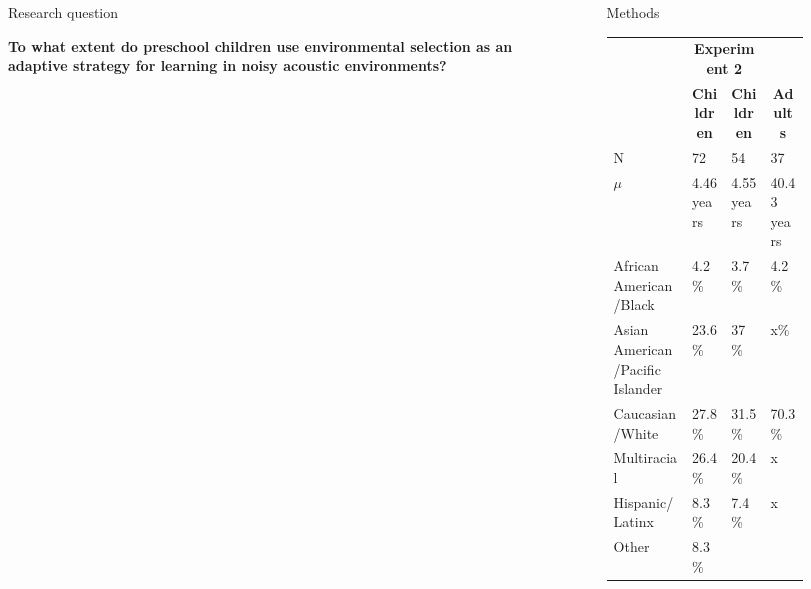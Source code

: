 \documentclass[final]{beamer}
\newlength{\sepwidth}
\newlength{\colwidth}
\newcommand{\separatorcolumn}{\begin{column}{\sepwidth}\end{column}}
\begin{document}
\begin{frame}[t]
\begin{columns}[t]
\begin{column}{\colwidth}
\begin{block}{Research question}
    \end{block}

  \begin{alertblock}

    \textbf{To what extent do preschool children use environmental selection as an adaptive strategy for learning in noisy acoustic environments?}

  \end{alertblock}

\end{column}

\separatorcolumn

\begin{column}{\colwidth}

  \begin{block}{Methods}

    \begin{itemize}
      \begin{table}[ht]
        \centering
        \begin{tabular}{|p{0.3\linewidth}|p{0.15\linewidth}|p{0.15\linewidth}| p{0.15\linewidth}|}
          \hline
          \right
          \rowcolor{cardinalred!80}
          \multicolumn{2}{|c|}{\textbf{Experiment 1}} & \multicolumn{2}{c|}{\textbf{Experiment 2}} \\
          \cline{2-4}
          \rowcolor{cardinalred!80}
          \multicolumn{1}{|c|}{\textbf{}} &
          \multicolumn{1}{|c|}{\textbf{Children}} & 
          \multicolumn{1}{|c|}{\textbf{Children}} & 
          \multicolumn{1}{|c|}{\textbf{Adults}} \\
          \hline
          N & 72 & 54 & 37 \\
          \hline
          \rowcolor{cardinalred!40}
          $\mu$ & 4.46 years & 4.55 years & 40.43 years \\
          \hline
          \raggedright African American/Black & 4.2\% & 3.7\% & 4.2\% \\ 
          \hline
          \rowcolor{cardinalred!40}
          \raggedright Asian American/Pacific Islander & 23.6\% & 37\% & x\% \\
          \hline
          Caucasian/White & 27.8\% & 31.5\% & 70.3\% \\
          \hline
          \rowcolor{cardinalred!40}
          Multiracial & 26.4\% & 20.4\% & x \\
          \hline
          Hispanic/Latinx & 8.3\% & 7.4\% & x \\
          \hline
          \rowcolor{cardinalred!40}
          Other & 8.3\% & & \\
          \hline
        \end{tabular}
      \end{table}         
    

\end{itemize}
\end{block}
\end{column}
\end{columns}
\end{frame}
\end{document}
